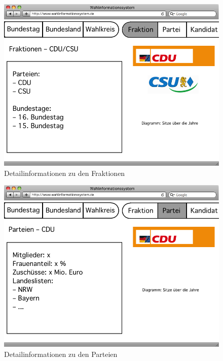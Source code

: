 \documentclass[a4paper]{article}
\begin{document}
\begin{figure}[H]
\centering
\includegraphics[scale=0.4]{Mockups/fraktion}
\caption{Detailinformationen zu den Fraktionen}
\end{figure}

\begin{figure}[H]
\centering
\includegraphics[scale=0.4]{Mockups/partei}
\caption{Detailinformationen zu den Parteien}
\end{figure}
\end{document}
